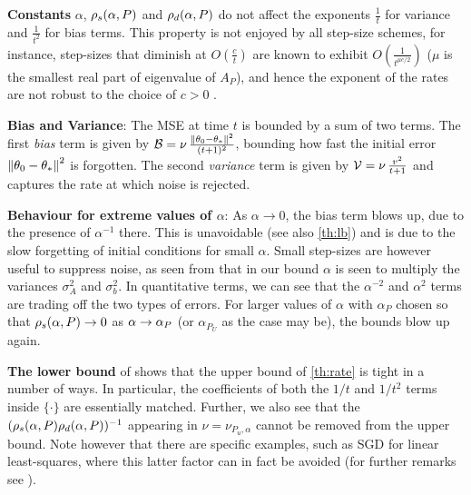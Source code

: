 \textbf{Constants} {$\alpha$, $\rho_s(\alpha,P)$ and $\rho_d(\alpha,P)$} do not affect the exponents $\frac{1}{t}$ for variance and $\frac{1}{t^2}$ for bias terms. This property is not enjoyed by all step-size schemes, for instance, step-sizes that diminish at $O(\frac{c}{t})$ are known to exhibit $O(\frac{1}{t^{\mu c/2}})$ ($\mu$ is the smallest real part of eigenvalue of $A_P$), and hence the exponent of the rates are not robust to the choice of $c>0$ \cite{bach-moulines,korda-prashanth}.

\textbf{Bias and Variance}: The MSE at time $t$ is bounded by a sum of two terms. The first \emph{bias} term is given by $\mathcal{B}=\nu \,\frac{\left\| \theta_0-\theta_*\right\|^2}{(t+1)^2}$, bounding how fast the initial error $\left\| \theta_0-\theta_*\right\|^2$ is forgotten. 
The second \emph{variance} term is  given by $\mathcal{V}=\nu\, \frac{v^2}{t+1} $ and captures the rate at which noise is rejected.

\textbf{Behaviour for extreme values of $\alpha$}: 
As $\alpha\to 0$, the bias term blows up, due to the presence of $\alpha^{-1}$ there. This is unavoidable (see also \cref{th:lb}) and is due to the slow forgetting of initial conditions for small $\alpha$. Small step-sizes are however useful to suppress noise, as seen from that in our bound $\alpha$ is seen to multiply the variances $\sigma^2_A$ and $\sigma^2_b$. In quantitative terms, we can see that the $\alpha^{-2}$ and $\alpha^2$ terms are trading off the two types of errors. 
For larger values of $\alpha$ with $\alpha_P$ chosen so that $\rho_s(\alpha,P)\rightarrow 0$ as $\alpha\rightarrow \alpha_{P}$  (or $\alpha_{P_U}$ as the case may be), the bounds blow up again.

\textbf{The lower bound} of  shows that the upper bound of \cref{th:rate} is tight in a number of ways.
In particular, the coefficients of both the $1/t$ and $1/t^2$ terms inside $\{ \cdot \}$ are essentially matched.
Further, we also see that
the $(\rho_s(\alpha,P)\rho_d(\alpha,P))^{-1}$ appearing in $\nu = \nu_{P_u,\alpha}$ cannot be removed from the upper bound. 
Note however that there are specific examples, such as SGD for linear least-squares,
where this latter factor can in fact be avoided (for further remarks see ).

%
